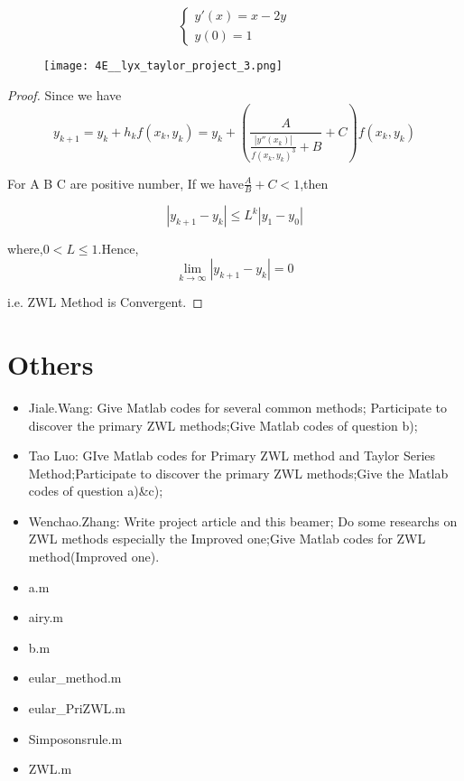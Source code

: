 \documentclass[english]{beamer}
\def\lyxframeend{} %
\begin{document}
\[
\left\{ \begin{array}{ll}
y'(x)=x-2y\\
y(0)=1
\end{array}\right.
\]


\begin{figure}
\caption{\protect\texttt{[image: 4E\_\_lyx\_taylor\_project\_3.png]}}
\end{figure}



\lyxframeend{}
\begin{proof}%
Since we have 
\[
y_{k+1}=y_{k}+h_{k}f(x_{k},y_{k})=y_{k}+\left(\frac{A}{\frac{|y''(x_{k})|}{f(x_{k},y_{k})^{3}}+B}+C\right)f(x_{k},y_{k})
\]


For A B C are positive number, If we have$\frac{A}{B}+C<1$,then

\[
|y_{k+1}-y_{k}|\leq L^{k}|y_{1}-y_{0}|
\]


where,$0<L\leq1$.Hence,
\[
\lim_{k\rightarrow\infty}|y_{k+1}-y_{k}|=0
\]


i.e. ZWL Method is Convergent.
\end{proof}%

\lyxframeend{}\section{Others}


\lyxframeend{}
\begin{itemize}
\item Jiale.Wang: Give Matlab codes for several common methods; Participate
to discover the primary ZWL methods;Give Matlab codes of question
b);
\item Tao Luo: GIve Matlab codes for Primary ZWL method and Taylor Series
Method;Participate to discover the primary ZWL methods;Give the Matlab
codes of question a)\&c);
\item Wenchao.Zhang: Write project article and this beamer; Do some researchs
on ZWL methods especially the Improved one;Give Matlab codes for ZWL
method(Improved one).
\end{itemize}

\lyxframeend{}
\begin{itemize}
\item a.m
\item airy.m
\item b.m
\item eular\_method.m
\item eular\_PriZWL.m
\item Simposonsrule.m
\item ZWL.m
\end{itemize}
\end{document}
